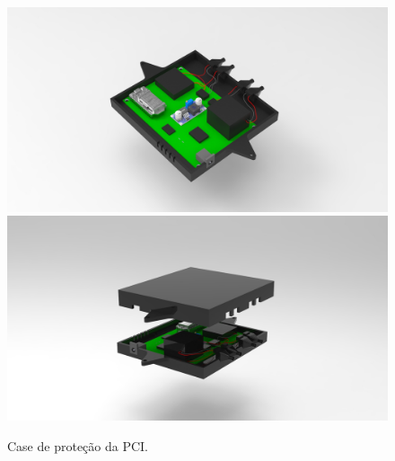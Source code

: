 \begin{figure}[H]
  \centering
  \includegraphics[scale=0.2]{Figuras/BASE/untitled.11.jpg}
  \includegraphics[scale=0.2]{Figuras/BASE/untitled.12.jpg}
  \caption{Case de proteção da PCI.}
  \label{fig:Case de proteção da PCI render}
\end{figure}